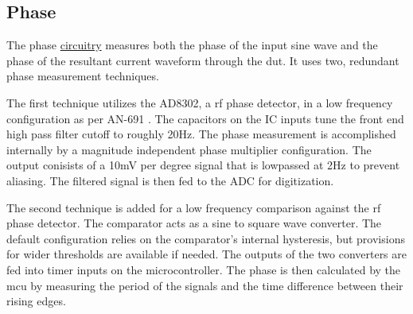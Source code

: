 \subsection{Phase}

The phase \hyperlink{sch:imph}{circuitry} measures both the phase of the input sine wave and the phase of the resultant current waveform through the \gls{dut}. It uses two, redundant phase measurement techniques.

The first technique utilizes the AD8302, a \gls{rf} phase detector, in a low frequency configuration as per AN-691 \cite{AD8302_AppNote}. The capacitors on the IC inputs tune the front end high pass filter cutoff to roughly 20Hz. The phase measurement is accomplished internally by a magnitude independent phase multiplier configuration. The output conisists of a 10mV per degree signal that is lowpassed at 2Hz to prevent aliasing. The filtered signal is then fed to the ADC for digitization.

The second technique is added for a low frequency comparison against the \gls{rf} phase detector. The comparator acts as a sine to square wave converter. The default configuration relies on the comparator's internal hysteresis, but provisions for wider thresholds are available if needed. The outputs of the two converters are fed into timer inputs on the microcontroller. The phase is then calculated by the \gls{mcu} by measuring the period of the signals and the time difference between their rising edges.

